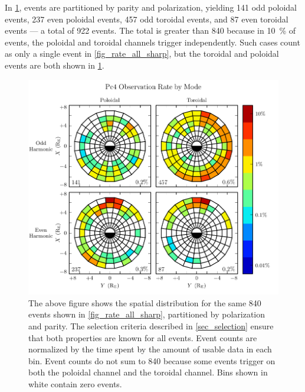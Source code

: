 
In \cref{fig_mode_all_sharp}, events are partitioned by parity and polarization, yielding 141 odd poloidal events, 237 even poloidal events, 457 odd toroidal events, and 87 even toroidal events --- a total of 922 events. The total is greater than 840 because in \about\SI{10}{\percent} of events, the poloidal and toroidal channels trigger independently. Such cases count as only a single event in \cref{fig_rate_all_sharp}, but the toroidal and poloidal events are both shown in \cref{fig_mode_all_sharp}. 




\begin{figure}[!htb]
    \centering
    \includegraphics[width=\textwidth]{figures/mode_all_sharp.pdf}
    \caption[Observation Rate of Pc4 Events by Mode]{
      The above figure shows the spatial distribution for the same 840 events shown in \cref{fig_rate_all_sharp}, partitioned by polarization and parity. The selection criteria described in \cref{sec_selection} ensure that both properties are known for all events. Event counts are normalized by the time spent by the amount of usable data in each bin. Event counts do not sum to 840 because some events trigger on both the poloidal channel and the toroidal channel. Bins shown in white contain zero events. 
    }
    \label{fig_mode_all_sharp}
\end{figure}

